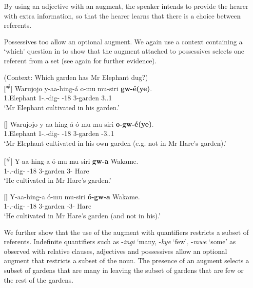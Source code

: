 \documentclass[output=paper]{langscibook}
\begin{document}
\z

By using an adjective with an augment, the speaker intends to provide the hearer with extra information, so that the hearer learns that there is a choice between referents.

Possessives too allow an optional augment. We again use a context containing a ‘which’ question in  to show that the augment attached to possessives selects one referent from a set (see again \citealt{AsiimweEtAl2023} for further evidence).

\ea
\label{bkm:Ref111494278}
(Context: Which garden has Mr Elephant dug?)\\
\ea
[\textsuperscript{\#}]{
\gll
Warujojo  y-aa-hing-á  o-mu  mu-siri  \textbf{gw-é(ye)}.\\
1.Elephant  1\SM{}-\N{}.\PST{}-dig-\FV{}  \AUG{}-18  3-garden  3.\POSS{}.1\\
\glt
`Mr Elephant cultivated in his garden.’\\
}


\ex
[]{
\gll
Warujojo  y-aa-hing-á  ó-mu  mu-siri  \textbf{o-gw-é(ye)}.\\
1.Elephant  1\SM{}-\N{}.\PST{}-dig-\FV{}  \AUG{}-18  3-garden  \AUG{}-3.\POSS{}.1\\
\glt
`Mr Elephant cultivated in his own garden (e.g. not in Mr Hare’s garden).’\\
}


\ex
[\textsuperscript{\#}]{
\gll
Y-aa-hing-a  ó-mu  mu-siri  \textbf{gw-a}  Wakame.\\
1\SM{}-\N{}.\PST{}-dig-\FV{}  \AUG{}-18  3-garden  3-\CONN{}  Hare\\
\glt
`He cultivated in Mr Hare’s garden.’\\
}


\ex
[]{
\gll
Y-aa-hing-a  ó-mu  mu-siri  \textbf{ó-gw-a}  Wakame.\\
1\SM{}-\N{}.\PST{}-dig-\FV{}  \AUG{}-18  3-garden  \AUG{}-3-\CONN{}  Hare\\
\glt
`He cultivated in Mr Hare’s garden (and not in his).’\\
}


\z
\z

We further show that the use of the augment with quantifiers restricts a subset of referents. Indefinite quantifiers such as -\textit{ingi} ‘many, -\textit{kye} ‘few’, -\textit{mwe} ‘some’ as observed with relative clauses, adjectives and possessives allow an optional augment that restricts a subset of the noun. The presence of an augment selects a subset of gardens that are many in  leaving the subset of gardens that are few or the rest of the gardens.
\end{document}
